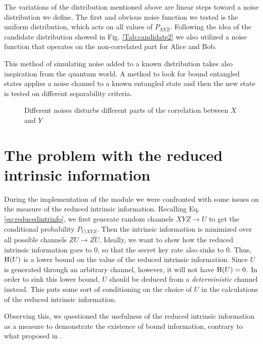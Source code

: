	The variations of the distribution mentioned above are linear steps toward a noise distribution we define.
	The first and obvious noise function we tested is the uniform distribution, which acts on all values of $P_{XYZ}$.
	Following the idea of the candidate distribution showed in Fig. \ref{Tab:candidate2} we  also utilized a noise function that operates on the non-correlated part for Alice and Bob.
	
	This method of simulating noise added to a known distribution takes also inspiration from the quantum world. 
	A method to look for bound entangled states applies a noise channel to a known entangled state and then the new state is tested on different separability criteria.
	
	 
	\begin{figure}
		\begin{subfigure}{0.5\textwidth}
			
		\end{subfigure}
		\begin{subfigure}{0.5\textwidth}
			
		\end{subfigure}
		\caption{Different noises disturbs different parts of the correlation between $X$ and $Y$}
		\label{Fig:noises}
	\end{figure}
	
\section{The problem with the reduced intrinsic information}
    During the implementation of the module we were confronted with some issues on the measure of the reduced intrinsic information.
    Recalling Eq. \ref{eq:reducedintrinfo}, we first generate random channels $XYZ \rightarrow U$ to get the conditional probability $P_{U|XYZ}$. 
    Then the intrinsic information is minimized over all possible channels $ZU \rightarrow \bar{ZU}$.
    Ideally, we want to show how the reduced intrinsic information goes to $0$, so that the secret key rate also sinks to $0$. 
    Thus, $\operatorname{H} (U)$ is a lower bound on the value of the reduced intrinsic information.
    Since $U$ is generated through an arbitrary channel, however, it will not have $\operatorname{H} (U) = 0$.
    In order to sink this lower bound, $U$ should be deduced from a \emph{deterministic} channel instead.
    This puts some sort of conditioning on the choice of $U$ in the calculations of the reduced intrinsic information.
    
    Observing this, we questioned the usefulness of the reduced intrinsic information as a measure to demonstrate the existence of bound information, contrary to what proposed in \cite{RW03}. 
    
    